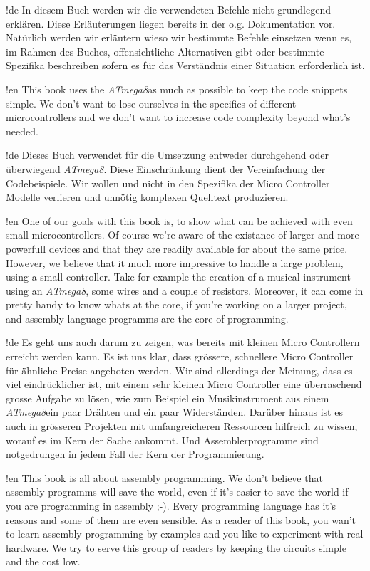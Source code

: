 \documentclass[twoside,12pt,authoryear,openright]{book}
\newcommand{\at}{\textit{ATmega8}}
\begin{document}
!de In diesem Buch werden wir die verwendeten Befehle nicht grundlegend erklären. Diese Erläuterungen liegen bereits in der o.g. Dokumentation vor. Natürlich werden wir erläutern wieso wir bestimmte Befehle einsetzen wenn es, im Rahmen des Buches, offensichtliche Alternativen gibt oder bestimmte Spezifika beschreiben sofern es für das Verständnis einer Situation erforderlich ist.



!en This book uses the \at as much as possible to keep the code snippets simple. We don't want to lose ourselves in the specifics of different microcontrollers and we don't want to increase code complexity beyond what's needed.

!de Dieses Buch verwendet für die Umsetzung entweder durchgehend oder überwiegend \at. Diese Einschränkung dient der Vereinfachung der Codebeispiele. Wir wollen und nicht in den Spezifika der Micro Controller Modelle verlieren und unnötig komplexen Quelltext produzieren.



!en One of our goals with this book is, to show what can be achieved with even small microcontrollers. Of course we're aware of the existance of larger and more powerfull devices and that they are readily available for about the same price. However, we believe that it much more impressive to handle a large problem, using a small controller. Take for example the creation of a musical instrument using an \at, some wires and a couple of resistors. Moreover, it can come in pretty handy to know whats at the core, if you're working on a larger project, and assembly-language programms are the core of programming.  

!de Es geht uns auch darum zu zeigen, was bereits mit kleinen Micro Controllern erreicht werden kann. Es ist uns klar, dass grössere, schnellere Micro Controller für ähnliche Preise angeboten werden. Wir sind allerdings der Meinung, dass es viel eindrücklicher ist, mit einem sehr kleinen Micro Controller eine überraschend grosse Aufgabe zu lösen, wie zum Beispiel ein Musikinstrument aus einem \at ein paar Drähten und ein paar Widerständen. Darüber hinaus ist es auch in grösseren Projekten mit umfangreicheren Ressourcen hilfreich zu wissen, worauf es im Kern der Sache ankommt. Und Assemblerprogramme sind notgedrungen in jedem Fall der Kern der Programmierung.



!en This book is all about assembly programming. We don't believe that assembly programms will save the world, even if it's easier to save the world if you are programming in assembly ;-). Every programming language has it's reasons and some of them are even sensible. As a reader of this book, you wan't to learn assembly programming by examples and you like to experiment with real hardware. We try to serve this group of readers by keeping the circuits simple and the cost low.
\end{document}
